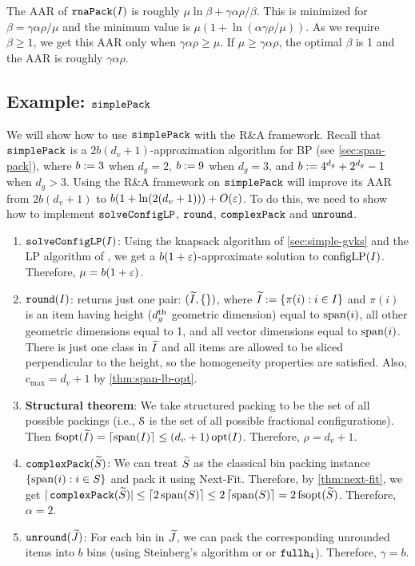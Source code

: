 
The AAR of $\rnaPack(I)$ is roughly $\mu\ln\beta + \gamma\alpha\rho/\beta$.
This is minimized for $\beta = \gamma\alpha\rho/\mu$ and the minimum value is
$\mu\left(1 + \ln\left(\alpha\gamma\rho/\mu\right)\right)$.
As we require $\beta \ge 1$, we get this AAR only when $\gamma\alpha\rho \ge \mu$.
If $\mu \ge \gamma\alpha\rho$, the optimal $\beta$ is 1 and the AAR is roughly $\gamma\alpha\rho$.

\subsection{Example: \texorpdfstring{$\simplePack$}{simple-pack}}
\label{sec:rna:simple-pack}

We will show how to use $\simplePack$ with the R\&A framework.
Recall that $\simplePack$ is a $2b(d_v+1)$-approximation algorithm for  BP
(see \cref{sec:span-pack}), where
$b \defeq 3$ when $d_g=2$, $b \defeq 9$ when $d_g = 3$,
and $b \defeq 4^{d_g}+2^{d_g}-1$ when $d_g > 3$.
Using the R\&A framework on $\simplePack$ will
improve its AAR from $2b(d_v+1)$ to $b(1+\ln(2(d_v+1))) + O(\eps)$.
To do this, we need to show how to implement $\cLPsolve$, $\round$, $\complexPack$ and $\unround$.

\begin{enumerate}
\item $\cLPsolve(I)$:
Using the knapsack algorithm of \cref{sec:simple-gvks} and the LP algorithm of \cite{eku-pst},
we get a $b(1+\eps)$-approximate solution to $\cLP(I)$. Therefore, $\mu = b(1+\eps)$.

\item $\round(I)$:
returns just one pair: $(\Itild, \{\})$, where $\Itild \defeq \{\pi(i): i \in I\}$
and $\pi(i)$ is an item having height ($d_g\Th$ geometric dimension) equal to $\Span(i)$,
all other geometric dimensions equal to 1, and all vector dimensions equal to $\Span(i)$.
There is just one class in $\Itild$ and all items are allowed to be sliced
perpendicular to the height, so the homogeneity properties are satisfied.
Also, $c_{\max} = d_v+1$ by \cref{thm:span-lb-opt}.

\item \textbf{Structural theorem}:
We take structured packing to be the set of all possible packings
(i.e., $\Scal$ is the set of all possible fractional configurations).
Then $\fsopt(\Itild) = \ceil{\Span(I)} \le (d_v+1)\opt(I)$. Therefore, $\rho = d_v+1$.

\item $\complexPack(\Stild)$:
We can treat $\Stild$ as the classical bin packing instance $\{\Span(i): i \in S\}$
and pack it using Next-Fit. Therefore, by \cref{thm:next-fit}, we get
$|\complexPack(\Stild)| \le \ceil{2\Span(S)} \le 2\ceil{\Span(S)} = 2\fsopt(\Stild)$.
Therefore, $\alpha = 2$.

\item $\unround(\Jtild)$:
For each bin in $\Jtild$, we can pack the corresponding unrounded items into $b$ bins
(using Steinberg's algorithm or \cite{diedrich2008approximation} or $\fhk[4]$).
Therefore, $\gamma = b$.
\end{enumerate}

